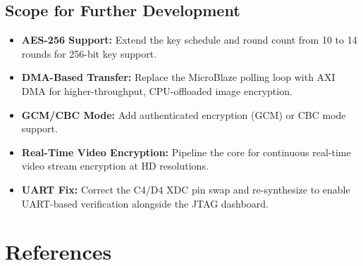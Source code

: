\subsection{Scope for Further Development}

\begin{itemize}[leftmargin=*]
    \item \textbf{AES-256 Support:} Extend the key schedule and round count from 10 to 14 rounds for 256-bit key support.
    \item \textbf{DMA-Based Transfer:} Replace the MicroBlaze polling loop with AXI DMA for higher-throughput, CPU-offloaded image encryption.
    \item \textbf{GCM/CBC Mode:} Add authenticated encryption (GCM) or CBC mode support.
    \item \textbf{Real-Time Video Encryption:} Pipeline the core for continuous real-time video stream encryption at HD resolutions.
    \item \textbf{UART Fix:} Correct the C4/D4 XDC pin swap and re-synthesize to enable UART-based verification alongside the JTAG dashboard.
\end{itemize}

\section{References}





